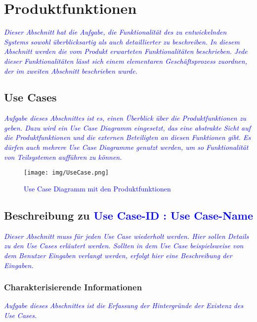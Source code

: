 \section{Produktfunktionen}
\textcolor{blue}{\textit{Dieser Abschnitt hat die Aufgabe, die Funktionalität des zu entwickelnden Systems sowohl überblicksartig als auch detaillierter zu beschreiben. In diesem Abschnitt werden die vom Produkt erwarteten Funktionalitäten beschrieben. Jede dieser Funktionalitäten lässt sich einem elementaren Geschäftsprozess zuordnen, der im zweiten Abschnitt beschrieben wurde.}}

\subsection{Use Cases}
\textcolor{blue}{\textit{Aufgabe dieses Abschnittes ist es, einen Überblick über die Produktfunktionen zu geben. Dazu wird ein Use Case Diagramm eingesetzt, das eine abstrakte Sicht auf die Produktfunktionen und die externen Beteiligten an diesen Funktionen gibt. Es dürfen auch mehrere Use Case Diagramme genutzt werden, um so Funktionalität von Teilsystemen aufführen zu können.}}

\begin{figure}[H]
\centering
\texttt{[image: img/UseCase.png]}
\caption{\textcolor{blue}{Use Case Diagramm mit den Produktfunktionen}}
\label{UseCase}
\end{figure}

\subsection{Beschreibung zu \textcolor{blue}{Use Case-ID : Use Case-Name}}
\textcolor{blue}{\textit{Dieser Abschnitt muss für jeden Use Case wiederholt werden. Hier sollen Details zu den Use Cases erläutert werden. Sollten in dem Use Case beispielsweise von dem Benutzer Eingaben verlangt werden, erfolgt hier eine Beschreibung der Eingaben.}}

\subsubsection*{Charakterisierende Informationen}
\textcolor{blue}{\textit{Aufgabe dieses Abschnittes ist die Erfassung der Hintergründe der Existenz des Use Cases.}}

